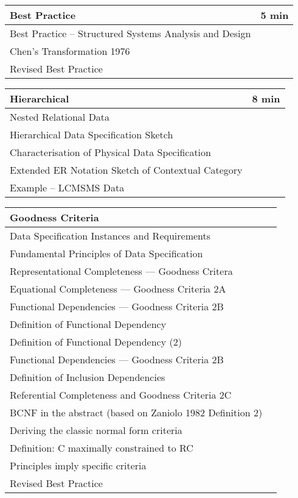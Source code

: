 \documentclass[12pt,a4paper]{article}
\begin{document}
\begin{tabular}{|l|l|}
\hline
Best Practice & 5 min\\
\hline
Best Practice – Structured Systems Analysis and Design& \\
Chen’s Transformation 1976& \\
Revised Best Practice& \\
\end{tabular}

\begin{tabular}{|l|l|}
\hline
Hierarchical & 8 min\\
\hline
Nested Relational Data& \\
Hierarchical Data Specification Sketch& \\
Characterisation of Physical Data Specification& \\
Extended ER Notation Sketch of Contextual Category& \\
Example – LCMSMS Data& \\
\end{tabular}

\begin{tabular}{|l|l|}
\hline
Goodness Criteria & \\
\hline
Data Specification Instances and Requirements& \\
Fundamental Principles of Data Specification& \\
Representational Completeness — Goodness Critera& \\
Equational Completeness — Goodness Criteria 2A& \\
Functional Dependencies — Goodness Criteria 2B& \\
Definition of Functional Dependency& \\
Definition of Functional Dependency (2)& \\
Functional Dependencies — Goodness Criteria 2B& \\
Definition of Inclusion Dependencies& \\
Referential Completeness and Goodness Criteria 2C& \\
BCNF in the abstract (based on Zaniolo 1982 Definition 2)& \\
Deriving the classic normal form criteria& \\
Definition: C maximally constrained to RC& \\
Principles imply specific criteria& \\
Revised Best Practice& \\
\hline
\end{tabular}
\end{document}
